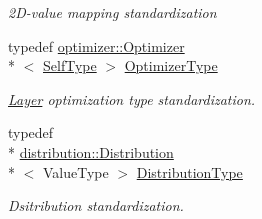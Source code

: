 \begin{DoxyCompactItemize}
\begin{DoxyCompactList}\small\item\em 2\-D-\/value mapping standardization \end{DoxyCompactList}\item 
typedef \hyperlink{classffnn_1_1optimizer_1_1_optimizer}{optimizer\-::\-Optimizer}\\*
$<$ \hyperlink{classffnn_1_1layer_1_1_convolution_acbe0dcc4d5e3c8e65b4cd2677beca126}{Self\-Type} $>$ \hyperlink{classffnn_1_1layer_1_1_convolution_a56d7e87a813fbd9954d283c0f7a32f9d}{Optimizer\-Type}
\begin{DoxyCompactList}\small\item\em \hyperlink{classffnn_1_1layer_1_1_layer}{Layer} optimization type standardization. \end{DoxyCompactList}\item 
typedef \\*
\hyperlink{classffnn_1_1distribution_1_1_distribution}{distribution\-::\-Distribution}\\*
$<$ Value\-Type $>$ \hyperlink{classffnn_1_1layer_1_1_convolution_a63016232e871a6869432158dda2ff8dc}{Distribution\-Type}
\begin{DoxyCompactList}\small\item\em Dsitribution standardization. \end{DoxyCompactList}\end{DoxyCompactItemize}
